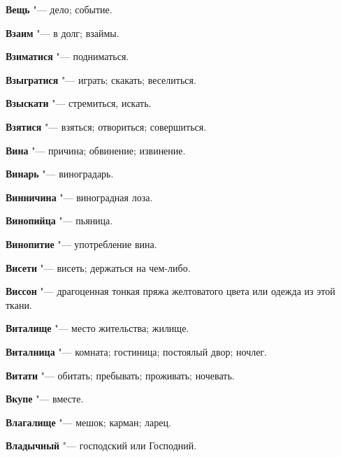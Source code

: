 \begin{mymulticols}{2}
\noindent\textbf{Вещь} "--- дело; событие. 




\noindent\textbf{Взаим} "--- в долг; взаймы. 




\noindent\textbf{Взиматися} "--- подниматься. 




\noindent\textbf{Взыгратися} "--- играть; скакать; веселиться. 




\noindent\textbf{Взыскати} "--- стремиться, искать. 




\noindent\textbf{Взятися} "--- взяться; отвориться; совершиться. 




\noindent\textbf{Вина} "--- причина; обвинение; извинение. 




\noindent\textbf{Винарь} "--- виноградарь. 




\noindent\textbf{Винничина} "--- виноградная лоза. 




\noindent\textbf{Винопийца} "--- пьяница. 




\noindent\textbf{Винопитие} "--- употребление вина. 




\noindent\textbf{Висети} "--- висеть; держаться на чем-либо. 




\noindent\textbf{Виссон} "--- драгоценная тонкая пряжа желтоватого цвета или одежда из этой ткани. 




\noindent\textbf{Виталище} "--- место жительства; жилище. 




\noindent\textbf{Виталница} "--- комната; гостиница; постоялый двор; ночлег. 




\noindent\textbf{Витати} "--- обитать; пребывать; проживать; ночевать. 




\noindent\textbf{Вкупе} "--- вместе. 




\noindent\textbf{Влагалище} "--- мешок; карман; ларец. 




\noindent\textbf{Владычный} "--- господский или Господний. 





\end{mymulticols}
